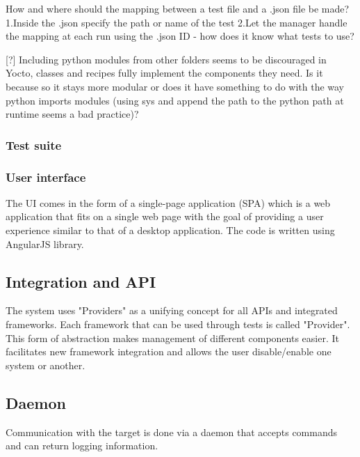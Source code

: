 \documentclass{article}
\begin{document}
				How and where should the mapping between a test file and a .json file be made?
				1.Inside the .json specify the path or name of the test
				2.Let the manager handle the mapping at each run using the .json ID - how does it know what tests to use?

				[?] Including python modules from other folders seems to be discouraged in Yocto, classes and recipes fully implement the components they need. Is it because so it stays more modular or does it have something to do with the way python imports modules (using sys and append the path to the python path at runtime seems a bad practice)?

			\subsubsection{Test suite}


			\subsubsection{User interface}
				The UI comes in the form of a single-page application (SPA) which is a web application that fits on a single web page with the goal of providing a user experience similar to that of a desktop application. The code is written using AngularJS library.

		    \subsection{Integration and API}
                The system uses "Providers" as a unifying concept for all APIs and integrated frameworks. Each framework that can be used through tests is called "Provider". This form of abstraction makes management of different components easier. It facilitates new framework integration and allows the user disable/enable one system or another.

            \subsection{Daemon}
                Communication with the target is done via a daemon that accepts commands and can return logging information.
\end{document}
